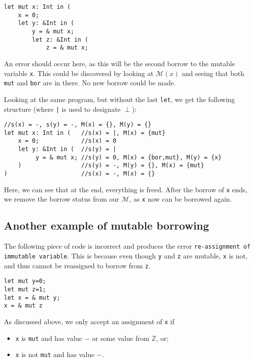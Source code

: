 \begin{verbatim}
let mut x: Int in (
    x = 0;
    let y: &Int in (
        y = & mut x;
        let z: &Int in (
            z = & mut x;
\end{verbatim}

An error should occur here, as this will be the second borrow to the mutable variable \texttt{x}. This could be discovered by looking at $\mathcal{M}(x)$ and seeing that both \texttt{mut} and \texttt{bor} are in there. No new borrow could be made. 

Looking at the same program, but without the last \texttt{let}, we get the following structure (where \texttt{|} is used to designate $\perp$):

\begin{verbatim}
//s(x) = -, s(y) = -, M(x) = {}, M(y) = {}
let mut x: Int in (   //s(x) = |, M(x) = {mut}
    x = 0;            //s(x) = 0
    let y: &Int in (  //s(y) = |
         y = & mut x; //s(y) = 0, M(x) = {bor,mut}, M(y) = {x}
    )                 //s(y) = -, M(y) = {}, M(x) = {mut}
)                     //s(x) = -, M(x) = {}
\end{verbatim}

Here, we can see that at the end, everything is freed. After the borrow of \texttt{x} ends, we remove the borrow status from our $\mathcal{M}$, as \texttt{x} now can be borrowed again. 

\subsection{Another example of mutable borrowing}
The following piece of code is incorrect and produces the error \texttt{re-assignment of immutable variable}. This is because even though \texttt{y} and \texttt{z} are mutable, \texttt{x} is not, and thus cannot be reassigned to borrow from \texttt{z}. 
\begin{verbatim}
let mut y=0;
let mut z=1;
let x = & mut y; 
x = & mut z
\end{verbatim}

As discussed above, we only accept an assignment of \texttt{x} if 
\begin{itemize}[noitemsep]
    \item \texttt{x} is \texttt{mut} and has value $-$ or some value from $\mathbb{Z}$, or;
    \item \texttt{x} is not \texttt{mut} and has value $-$.
\end{itemize}

